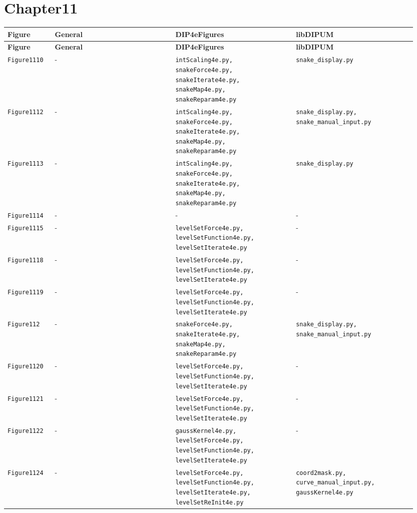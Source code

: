 \documentclass[10pt]{article}
\begin{document}
\section*{Chapter11}
\setlength{\tabcolsep}{4pt}
\begin{longtable}{p{0.11\linewidth} p{0.28\linewidth} p{0.28\linewidth} p{0.28\linewidth}}
\toprule
\textbf{Figure} & \textbf{General} & \textbf{DIP4eFigures} & \textbf{libDIPUM} \\
\midrule
\endfirsthead
\toprule
\textbf{Figure} & \textbf{General} & \textbf{DIP4eFigures} & \textbf{libDIPUM} \\
\midrule
\endhead
\bottomrule
\endfoot
\texttt{Figure1110} & - & \texttt{intScaling4e.py, snakeForce4e.py, snakeIterate4e.py, snakeMap4e.py, snakeReparam4e.py} & \texttt{snake\_display.py} \\
\texttt{Figure1112} & - & \texttt{intScaling4e.py, snakeForce4e.py, snakeIterate4e.py, snakeMap4e.py, snakeReparam4e.py} & \texttt{snake\_display.py, snake\_manual\_input.py} \\
\texttt{Figure1113} & - & \texttt{intScaling4e.py, snakeForce4e.py, snakeIterate4e.py, snakeMap4e.py, snakeReparam4e.py} & \texttt{snake\_display.py} \\
\texttt{Figure1114} & - & - & - \\
\texttt{Figure1115} & - & \texttt{levelSetForce4e.py, levelSetFunction4e.py, levelSetIterate4e.py} & - \\
\texttt{Figure1118} & - & \texttt{levelSetForce4e.py, levelSetFunction4e.py, levelSetIterate4e.py} & - \\
\texttt{Figure1119} & - & \texttt{levelSetForce4e.py, levelSetFunction4e.py, levelSetIterate4e.py} & - \\
\texttt{Figure112} & - & \texttt{snakeForce4e.py, snakeIterate4e.py, snakeMap4e.py, snakeReparam4e.py} & \texttt{snake\_display.py, snake\_manual\_input.py} \\
\texttt{Figure1120} & - & \texttt{levelSetForce4e.py, levelSetFunction4e.py, levelSetIterate4e.py} & - \\
\texttt{Figure1121} & - & \texttt{levelSetForce4e.py, levelSetFunction4e.py, levelSetIterate4e.py} & - \\
\texttt{Figure1122} & - & \texttt{gaussKernel4e.py, levelSetForce4e.py, levelSetFunction4e.py, levelSetIterate4e.py} & - \\
\texttt{Figure1124} & - & \texttt{levelSetForce4e.py, levelSetFunction4e.py, levelSetIterate4e.py, levelSetReInit4e.py} & \texttt{coord2mask.py, curve\_manual\_input.py, gaussKernel4e.py} \\

\end{longtable}
\end{document}
